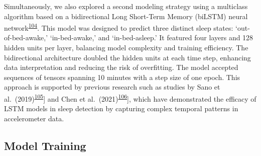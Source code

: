 \documentclass[
  9pt,
]{scrbook}
\begin{document}
Simultaneously, we also explored a second modeling strategy using a
multiclass algorithm based on a bidirectional Long Short-Term Memory
(biLSTM) neural
network\textsuperscript{\protect\hyperlink{ref-hochreiter_long_1997}{104}}.
This model was designed to predict three distinct sleep states:
`out-of-bed-awake,' `in-bed-awake,' and `in-bed-asleep.' It featured
four layers and 128 hidden units per layer, balancing model complexity
and training efficiency. The bidirectional architecture doubled the
hidden units at each time step, enhancing data interpretation and
reducing the risk of overfitting. The model accepted sequences of
tensors spanning 10 minutes with a step size of one epoch. This approach
is supported by previous research such as studies by Sano et
al.~(2019)\textsuperscript{\protect\hyperlink{ref-sano_multimodal_2019}{105}}{]}
and Chen et
al.~(2021)\textsuperscript{\protect\hyperlink{ref-chen_attention_2021}{106}}{]},
which have demonstrated the efficacy of LSTM models in sleep detection
by capturing complex temporal patterns in accelerometer data.

\hypertarget{model-training}{%
\subsection{Model Training}\label{model-training}}
\end{document}
